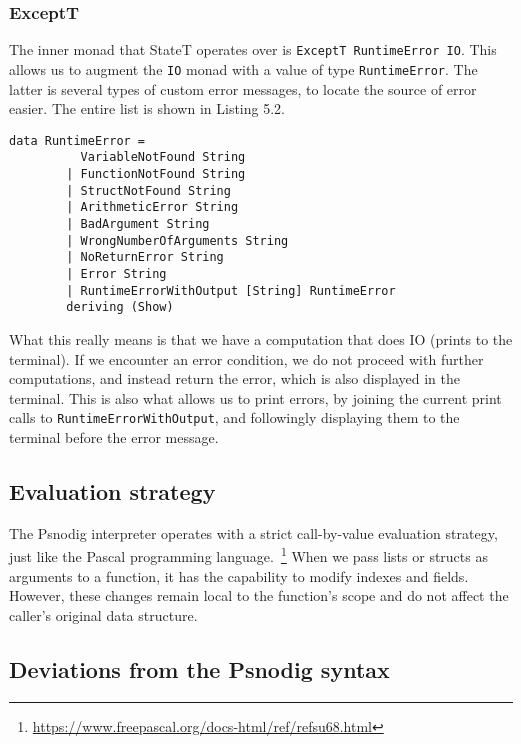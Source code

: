 \subsubsection{ExceptT}

The inner monad that StateT operates over is \texttt{ExceptT RuntimeError IO}. This allows us to augment the \texttt{IO} monad with a value of type \texttt{RuntimeError}. The latter is several types of custom error messages, to locate the source of error easier. The entire list is shown in Listing 5.2. \hfill \\

\begin{lstlisting}[caption={All error messages to be encountered in Psnodig}, captionpos=b]
    data RuntimeError =
          VariableNotFound String
        | FunctionNotFound String
        | StructNotFound String
        | ArithmeticError String
        | BadArgument String
        | WrongNumberOfArguments String
        | NoReturnError String
        | Error String
        | RuntimeErrorWithOutput [String] RuntimeError
        deriving (Show)
\end{lstlisting}


What this really means is that we have a computation that does IO (prints to the terminal). If we encounter an error condition, we do not proceed with further computations, and instead return the error, which is also displayed in the terminal. This is also what allows us to print errors, by joining the current print calls to \texttt{RuntimeErrorWithOutput}, and followingly displaying them to the terminal before the error message.

\subsection{Evaluation strategy}

The Psnodig interpreter operates with a strict call-by-value evaluation strategy, just like the Pascal programming language.~\footnote{\url{https://www.freepascal.org/docs-html/ref/refsu68.html}} When we pass lists or structs as arguments to a function, it has the capability to modify indexes and fields. However, these changes remain local to the function's scope and do not affect the caller's original data structure.

\subsection{Deviations from the Psnodig syntax}

